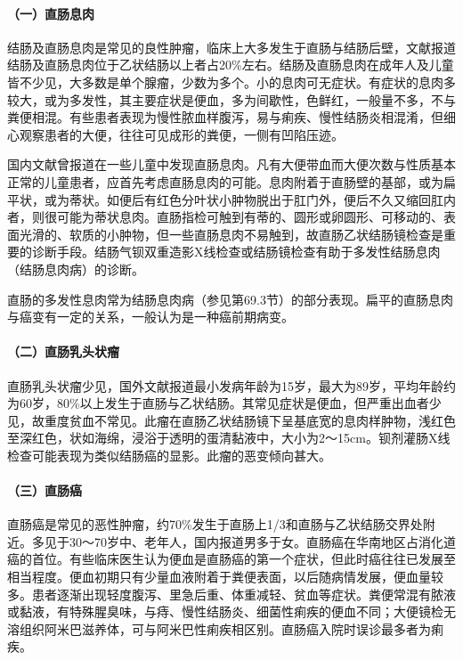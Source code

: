 \paragraph{（一）直肠息肉}

结肠及直肠息肉是常见的良性肿瘤，临床上大多发生于直肠与结肠后壁，文献报道结肠及直肠息肉位于乙状结肠以上者占20\%左右。结肠及直肠息肉在成年人及儿童皆不少见，大多数是单个腺瘤，少数为多个。小的息肉可无症状。有症状的息肉多较大，或为多发性，其主要症状是便血，多为间歇性，色鲜红，一般量不多，不与粪便相混。有些患者表现为慢性脓血样腹泻，易与痢疾、慢性结肠炎相混淆，但细心观察患者的大便，往往可见成形的粪便，一侧有凹陷压迹。

国内文献曾报道在一些儿童中发现直肠息肉。凡有大便带血而大便次数与性质基本正常的儿童患者，应首先考虑直肠息肉的可能。息肉附着于直肠壁的基部，或为扁平状，或为蒂状。如便后有红色分叶状小肿物脱出于肛门外，便后不久又缩回肛内者，则很可能为蒂状息肉。直肠指检可触到有蒂的、圆形或卵圆形、可移动的、表面光滑的、软质的小肿物，但一些直肠息肉不易触到，故直肠乙状结肠镜检查是重要的诊断手段。结肠气钡双重造影X线检查或结肠镜检查有助于多发性结肠息肉（结肠息肉病）的诊断。

直肠的多发性息肉常为结肠息肉病（参见第69.3节）的部分表现。扁平的直肠息肉与癌变有一定的关系，一般认为是一种癌前期病变。

\paragraph{（二）直肠乳头状瘤}

直肠乳头状瘤少见，国外文献报道最小发病年龄为15岁，最大为89岁，平均年龄约为60岁，80\%以上发生于直肠与乙状结肠。其常见症状是便血，但严重出血者少见，故重度贫血不常见。此瘤在直肠乙状结肠镜下呈基底宽的息肉样肿物，浅红色至深红色，状如海绵，浸浴于透明的蛋清黏液中，大小为2～15cm。钡剂灌肠X线检查可能表现为类似结肠癌的显影。此瘤的恶变倾向甚大。

\paragraph{（三）直肠癌}

直肠癌是常见的恶性肿瘤，约70\%发生于直肠上1/3和直肠与乙状结肠交界处附近。多见于30～70岁中、老年人，国内报道男多于女。直肠癌在华南地区占消化道癌的首位。有些临床医生认为便血是直肠癌的第一个症状，但此时癌往往已发展至相当程度。便血初期只有少量血液附着于粪便表面，以后随病情发展，便血量较多。患者逐渐出现轻度腹泻、里急后重、体重减轻、贫血等症状。粪便常混有脓液或黏液，有特殊腥臭味，与痔、慢性结肠炎、细菌性痢疾的便血不同；大便镜检无溶组织阿米巴滋养体，可与阿米巴性痢疾相区别。直肠癌入院时误诊最多者为痢疾。

